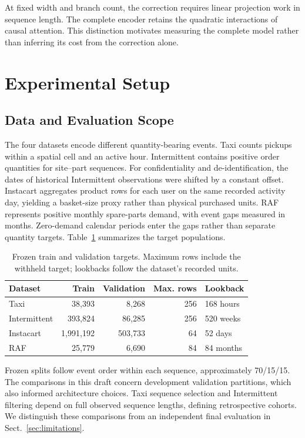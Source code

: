 \documentclass[runningheads]{llncs}
\begin{document}
At fixed width and branch count, the correction requires linear projection
work in sequence length. The complete encoder retains the quadratic
interactions of causal attention. This distinction motivates measuring the
complete model rather than inferring its cost from the correction alone.

\section{Experimental Setup}
\subsection{Data and Evaluation Scope}\label{sec:data-scope}
The four datasets encode different quantity-bearing events. Taxi counts
pickups within a spatial cell and an active hour. Intermittent contains
positive order quantities for site--part sequences. For confidentiality and
de-identification, the dates of historical Intermittent observations were
shifted by a constant offset. Instacart aggregates
product rows for each user on the same recorded activity day, yielding a
basket-size proxy rather than physical purchased units. RAF represents
positive monthly spare-parts demand, with event gaps measured in months.
Zero-demand calendar periods enter the gaps rather than separate quantity
targets. Table~\ref{tab:data} summarizes the target populations.

\begin{table}[t]
\caption{Frozen train and validation targets. Maximum rows include the
withheld target; lookbacks follow the dataset's recorded units.}
\label{tab:data}\centering\small
\begin{tabular}{lrrrl}
\toprule
Dataset & Train & Validation & Max. rows & Lookback\\
\midrule
Taxi & 38,393 & 8,268 & 256 & 168 hours\\
Intermittent & 393,824 & 86,285 & 256 & 520 weeks\\
Instacart & 1,991,192 & 503,733 & 64 & 52 days\\
RAF & 25,779 & 6,690 & 84 & 84 months\\
\bottomrule
\end{tabular}
\end{table}

Frozen splits follow event order within each sequence, approximately
70/15/15. The comparisons in this draft concern development validation
partitions, which also informed architecture choices. Taxi sequence
selection and Intermittent filtering depend on full observed sequence
lengths, defining retrospective cohorts. We distinguish these comparisons
from an independent final evaluation in Sect.~\ref{sec:limitations}.
\end{document}

